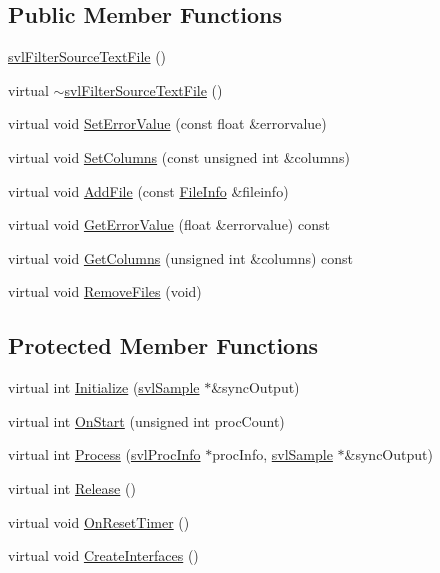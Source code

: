\subsection*{Public Member Functions}
\begin{DoxyCompactItemize}
\item 
\hyperlink{classsvl_filter_source_text_file_ae6a465c8523126615515e33295cb404d}{svl\+Filter\+Source\+Text\+File} ()
\item 
virtual \hyperlink{classsvl_filter_source_text_file_ab66f6d821cfce047fade32d5124d615f}{$\sim$svl\+Filter\+Source\+Text\+File} ()
\item 
virtual void \hyperlink{classsvl_filter_source_text_file_a58288c125317f62fe8f5026310607686}{Set\+Error\+Value} (const float \&errorvalue)
\item 
virtual void \hyperlink{classsvl_filter_source_text_file_a246dfb8b5db76e32679f80e2117ede1d}{Set\+Columns} (const unsigned int \&columns)
\item 
virtual void \hyperlink{classsvl_filter_source_text_file_aa04f8bea964d554a300454e2c2075bff}{Add\+File} (const \hyperlink{classsvl_filter_source_text_file_a84944643e5cff813e434ffcdb29be62d}{File\+Info} \&fileinfo)
\item 
virtual void \hyperlink{classsvl_filter_source_text_file_a04b3ac29361a47d3578c5b19d7d9b2f8}{Get\+Error\+Value} (float \&errorvalue) const 
\item 
virtual void \hyperlink{classsvl_filter_source_text_file_ac81894e754267c000cf5dca9e8913962}{Get\+Columns} (unsigned int \&columns) const 
\item 
virtual void \hyperlink{classsvl_filter_source_text_file_ab04b1180aa30c88c2402da5207b6313f}{Remove\+Files} (void)
\end{DoxyCompactItemize}
\subsection*{Protected Member Functions}
\begin{DoxyCompactItemize}
\item 
virtual int \hyperlink{classsvl_filter_source_text_file_a0eb6a5bf42c5d687c55f19f1aad64558}{Initialize} (\hyperlink{classsvl_sample}{svl\+Sample} $\ast$\&sync\+Output)
\item 
virtual int \hyperlink{classsvl_filter_source_text_file_a559239205141af18d50c7d9b017c0aef}{On\+Start} (unsigned int proc\+Count)
\item 
virtual int \hyperlink{classsvl_filter_source_text_file_ad4137e136bfd165e7a104d90c2feff7d}{Process} (\hyperlink{structsvl_proc_info}{svl\+Proc\+Info} $\ast$proc\+Info, \hyperlink{classsvl_sample}{svl\+Sample} $\ast$\&sync\+Output)
\item 
virtual int \hyperlink{classsvl_filter_source_text_file_a14f0e0c625c773535a7731ff3ee25a6a}{Release} ()
\item 
virtual void \hyperlink{classsvl_filter_source_text_file_a52ce788e22214bd13c6311c51a5a1cd7}{On\+Reset\+Timer} ()
\item 
virtual void \hyperlink{classsvl_filter_source_text_file_afd08fbdaa1e1f2ec9da474734375358f}{Create\+Interfaces} ()
\end{DoxyCompactItemize}
